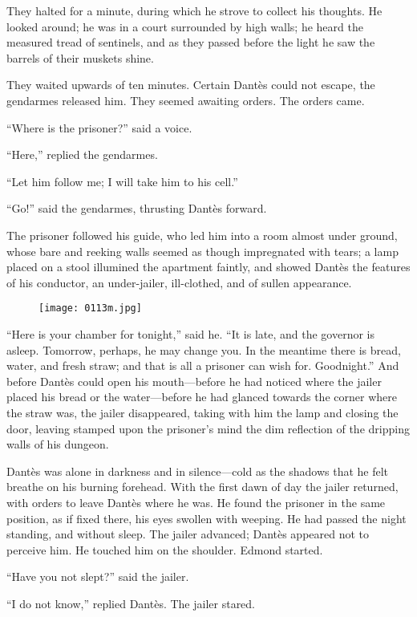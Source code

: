 They halted for a minute, during which he strove to collect his
thoughts. He looked around; he was in a court surrounded by high walls;
he heard the measured tread of sentinels, and as they passed before the
light he saw the barrels of their muskets shine.

They waited upwards of ten minutes. Certain Dantès could not escape,
the gendarmes released him. They seemed awaiting orders. The orders
came.

“Where is the prisoner?” said a voice.

“Here,” replied the gendarmes.

“Let him follow me; I will take him to his cell.”

“Go!” said the gendarmes, thrusting Dantès forward.

The prisoner followed his guide, who led him into a room almost under
ground, whose bare and reeking walls seemed as though impregnated with
tears; a lamp placed on a stool illumined the apartment faintly, and
showed Dantès the features of his conductor, an under-jailer,
ill-clothed, and of sullen appearance.

\begin{figure}[h]
\texttt{[image: 0113m.jpg]}
\end{figure}

“Here is your chamber for tonight,” said he. “It is late, and the
governor is asleep. Tomorrow, perhaps, he may change you. In the
meantime there is bread, water, and fresh straw; and that is all a
prisoner can wish for. Goodnight.” And before Dantès could open his
mouth—before he had noticed where the jailer placed his bread or the
water—before he had glanced towards the corner where the straw was, the
jailer disappeared, taking with him the lamp and closing the door,
leaving stamped upon the prisoner’s mind the dim reflection of the
dripping walls of his dungeon.

Dantès was alone in darkness and in silence—cold as the shadows that he
felt breathe on his burning forehead. With the first dawn of day the
jailer returned, with orders to leave Dantès where he was. He found the
prisoner in the same position, as if fixed there, his eyes swollen with
weeping. He had passed the night standing, and without sleep. The
jailer advanced; Dantès appeared not to perceive him. He touched him on
the shoulder. Edmond started.

“Have you not slept?” said the jailer.

“I do not know,” replied Dantès. The jailer stared.

